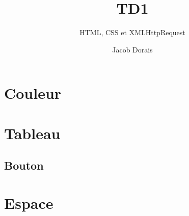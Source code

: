\documentclass{article}
\title{TD1}
\subtitle{HTML, CSS et XMLHttpRequest}
\author{Jacob Dorais}{Billy Bouchard}{B1}
\begin{document}
\maketitle
\section{Couleur}
\section{Tableau}
\subsection{Bouton}
\section{Espace}
\end{document}
